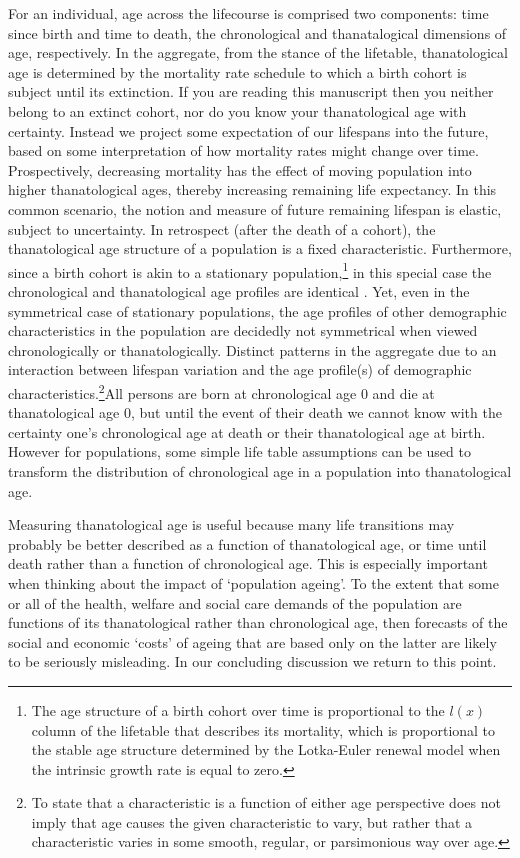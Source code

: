 \documentclass{article}
\begin{document}
For an
individual, age across the lifecourse is comprised two components: time since
birth and time to death, the chronological and thanatalogical dimensions of
age, respectively. In the aggregate, from the stance of the
lifetable, thanatological age is determined by the mortality rate schedule to
which a birth cohort is subject until its extinction. If you are reading this
manuscript then you neither belong to an extinct cohort, nor do you know your
thanatological age with certainty. Instead we project some
expectation of our lifespans into the future, based on some
interpretation of how mortality rates might change over time. Prospectively,
decreasing mortality has the effect of moving population into higher thanatological ages, thereby increasing remaining life expectancy. In this common scenario, the notion and measure of future remaining lifespan is elastic, subject to uncertainty.
In retrospect (after the death of a cohort), the thanatological age structure of a population is a fixed characteristic. Furthermore, since a birth cohort is akin to a
stationary population,\footnote{The age structure of a birth cohort over time is
proportional to the $l(x)$ column of the lifetable that describes its
mortality, which is proportional to the stable age structure determined by
the Lotka-Euler renewal model when the intrinsic growth rate is equal to zero.}
in this special case the chronological and thanatological age profiles are identical
\citep{brouard1989mouvements,vaupel2009life,rao2014generalization}. Yet, even in
the symmetrical case of stationary populations, the age profiles of other
demographic characteristics in the population are decidedly not symmetrical when
viewed chronologically or thanatologically. Distinct patterns in the aggregate
due to an interaction between lifespan variation and the age profile(s) of
demographic characteristics.\footnote{To state that a characteristic is a function of either
age perspective does not imply that age causes the given characteristic to vary,
but rather that a characteristic varies in some smooth, regular, or parsimonious
way over age.}All persons are born at chronological age 0 and
die at thanatological age 0, but until the event of their death we cannot
know with the certainty one's chronological age at death or their thanatological
age at birth.
However for populations, some simple life table assumptions can be used to transform the distribution of chronological age in a population into thanatological age.

Measuring thanatological age is useful because many life transitions may
probably be better described as a function of thanatological age, or time until death rather than a function of chronological age. This is especially important when thinking about the impact of ‘population ageing’. To the extent that some or all of the health, welfare and social care demands of the population are functions of its thanatological rather than chronological age, then forecasts of the social and economic ‘costs’ of ageing that are based only on the latter are likely to be seriously misleading. In our concluding discussion we return to this point. 
\end{document}
